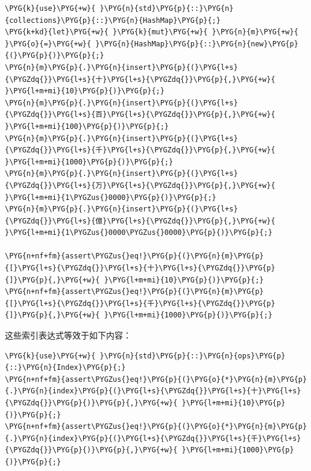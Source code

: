 \begin{Verbatim}[commandchars=\\\{\},breaklines=true,breakanywhere=true,fontsize=\codefont,xleftmargin=17bp]
\PYG{k}{use}\PYG{+w}{ }\PYG{n}{std}\PYG{p}{::}\PYG{n}{collections}\PYG{p}{::}\PYG{n}{HashMap}\PYG{p}{;}
\PYG{k+kd}{let}\PYG{+w}{ }\PYG{k}{mut}\PYG{+w}{ }\PYG{n}{m}\PYG{+w}{ }\PYG{o}{=}\PYG{+w}{ }\PYG{n}{HashMap}\PYG{p}{::}\PYG{n}{new}\PYG{p}{(}\PYG{p}{)}\PYG{p}{;}
\PYG{n}{m}\PYG{p}{.}\PYG{n}{insert}\PYG{p}{(}\PYG{l+s}{\PYGZdq{}}\PYG{l+s}{十}\PYG{l+s}{\PYGZdq{}}\PYG{p}{,}\PYG{+w}{ }\PYG{l+m+mi}{10}\PYG{p}{)}\PYG{p}{;}
\PYG{n}{m}\PYG{p}{.}\PYG{n}{insert}\PYG{p}{(}\PYG{l+s}{\PYGZdq{}}\PYG{l+s}{百}\PYG{l+s}{\PYGZdq{}}\PYG{p}{,}\PYG{+w}{ }\PYG{l+m+mi}{100}\PYG{p}{)}\PYG{p}{;}
\PYG{n}{m}\PYG{p}{.}\PYG{n}{insert}\PYG{p}{(}\PYG{l+s}{\PYGZdq{}}\PYG{l+s}{千}\PYG{l+s}{\PYGZdq{}}\PYG{p}{,}\PYG{+w}{ }\PYG{l+m+mi}{1000}\PYG{p}{)}\PYG{p}{;}
\PYG{n}{m}\PYG{p}{.}\PYG{n}{insert}\PYG{p}{(}\PYG{l+s}{\PYGZdq{}}\PYG{l+s}{万}\PYG{l+s}{\PYGZdq{}}\PYG{p}{,}\PYG{+w}{ }\PYG{l+m+mi}{1\PYGZus{}0000}\PYG{p}{)}\PYG{p}{;}
\PYG{n}{m}\PYG{p}{.}\PYG{n}{insert}\PYG{p}{(}\PYG{l+s}{\PYGZdq{}}\PYG{l+s}{億}\PYG{l+s}{\PYGZdq{}}\PYG{p}{,}\PYG{+w}{ }\PYG{l+m+mi}{1\PYGZus{}0000\PYGZus{}0000}\PYG{p}{)}\PYG{p}{;}

\PYG{n+nf+fm}{assert\PYGZus{}eq!}\PYG{p}{(}\PYG{n}{m}\PYG{p}{[}\PYG{l+s}{\PYGZdq{}}\PYG{l+s}{十}\PYG{l+s}{\PYGZdq{}}\PYG{p}{]}\PYG{p}{,}\PYG{+w}{ }\PYG{l+m+mi}{10}\PYG{p}{)}\PYG{p}{;}
\PYG{n+nf+fm}{assert\PYGZus{}eq!}\PYG{p}{(}\PYG{n}{m}\PYG{p}{[}\PYG{l+s}{\PYGZdq{}}\PYG{l+s}{千}\PYG{l+s}{\PYGZdq{}}\PYG{p}{]}\PYG{p}{,}\PYG{+w}{ }\PYG{l+m+mi}{1000}\PYG{p}{)}\PYG{p}{;}
\end{Verbatim}

这些索引表达式等效于如下内容：

\begin{Verbatim}[commandchars=\\\{\},breaklines=true,breakanywhere=true,fontsize=\codefont,xleftmargin=17bp]
\PYG{k}{use}\PYG{+w}{ }\PYG{n}{std}\PYG{p}{::}\PYG{n}{ops}\PYG{p}{::}\PYG{n}{Index}\PYG{p}{;}
\PYG{n+nf+fm}{assert\PYGZus{}eq!}\PYG{p}{(}\PYG{o}{*}\PYG{n}{m}\PYG{p}{.}\PYG{n}{index}\PYG{p}{(}\PYG{l+s}{\PYGZdq{}}\PYG{l+s}{十}\PYG{l+s}{\PYGZdq{}}\PYG{p}{)}\PYG{p}{,}\PYG{+w}{ }\PYG{l+m+mi}{10}\PYG{p}{)}\PYG{p}{;}
\PYG{n+nf+fm}{assert\PYGZus{}eq!}\PYG{p}{(}\PYG{o}{*}\PYG{n}{m}\PYG{p}{.}\PYG{n}{index}\PYG{p}{(}\PYG{l+s}{\PYGZdq{}}\PYG{l+s}{千}\PYG{l+s}{\PYGZdq{}}\PYG{p}{)}\PYG{p}{,}\PYG{+w}{ }\PYG{l+m+mi}{1000}\PYG{p}{)}\PYG{p}{;}
\end{Verbatim}

